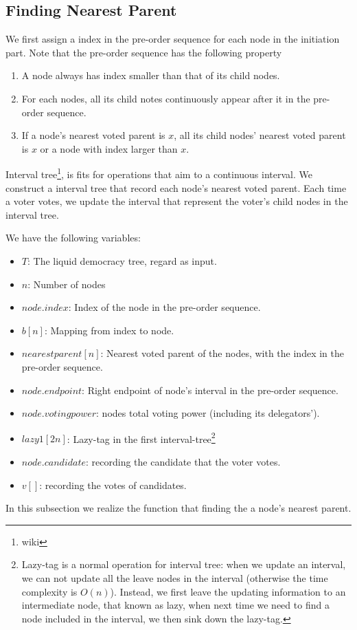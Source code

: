 \subsection{Finding Nearest Parent}
We first assign a index in the pre-order sequence for each node in the initiation part. Note that the pre-order sequence has the following property
\begin{enumerate}
	\item A node always has index smaller than that of its child nodes. 
    \item For each nodes, all its child notes continuously appear after it in the pre-order sequence.
	\item If a node's nearest voted parent is $x$, all its child nodes' nearest voted parent is $x$ or a node with index larger than $x$.
\end{enumerate}
Interval tree\footnote{wiki}, is fits for operations that aim to a continuous interval. We construct a interval tree that record each node's nearest voted parent. Each time a voter votes, we update the interval that represent the voter's child nodes in the interval tree. 

We have the following variables:
\begin{itemize}
	\item $T$: The liquid democracy tree, regard as input. 
	\item $n$: Number of nodes
	\item $node.index$: Index of the node in the pre-order sequence.
	\item $b[n]$: Mapping from index to node.
	\item $nearestparent[n]$: Nearest voted parent of the nodes, with the index in the pre-order sequence. 
	\item $node.endpoint$: Right endpoint of node's interval in the pre-order sequence. 
	\item $node.votingpower$: nodes total voting power (including its delegators'). 
	\item $lazy1[2n]$: Lazy-tag in the first interval-tree\footnote{Lazy-tag is a normal operation for interval tree: when we update an interval, we can not update all the leave nodes in the interval (otherwise the time complexity is $O(n)$). Instead, we first leave the updating information to an intermediate node, that known as lazy, when next time we need to find a node included in the interval, we then sink down the lazy-tag. }
	\item $node.candidate$: recording the candidate that the voter votes.
	\item $v[]$: recording the votes of candidates.
\end{itemize}
In this subsection we realize the function that finding the a node's nearest parent.

